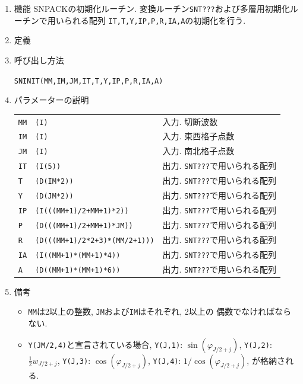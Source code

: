 \documentclass[a4j,fleqn]{jarticle}
\begin{document}
\begin{enumerate}

\item 機能 
SNPACKの初期化ルーチン. 
変換ルーチン{\tt SNT???}および多層用初期化ルーチンで用いられる配列
{\tt IT,T,Y,IP,P,R,IA,A}の初期化を行う.

\item 定義

\item 呼び出し方法 
    
{\tt SNINIT(MM,IM,JM,IT,T,Y,IP,P,R,IA,A)}
  
\item パラメーターの説明 
    
\begin{tabular}{lll}
{\tt MM} & {\tt (I)} & 入力. 切断波数\\
{\tt IM} & {\tt (I)} & 入力. 東西格子点数\\
{\tt JM} & {\tt (I)} & 入力. 南北格子点数\\
{\tt IT}  & {\tt (I(5))}    & 出力. {\tt SNT???}で用いられる配列\\
{\tt T}   & {\tt (D(IM*2))} & 出力. {\tt SNT???}で用いられる配列\\
{\tt Y}  & {\tt (D(JM*2))} & 出力. {\tt SNT???}で用いられる配列\\
{\tt IP}  & {\tt (I(((MM+1)/2+MM+1)*2))} & 出力. {\tt SNT???}で用いられる配列\\
{\tt P}  & {\tt (D(((MM+1)/2+MM+1)*JM))} & 出力. {\tt SNT???}で用いられる配列\\
{\tt R}  & {\tt (D(((MM+1)/2*2+3)*(MM/2+1)))} 
            & 出力. {\tt SNT???}で用いられる配列\\
{\tt IA}  & {\tt (I((MM+1)*(MM+1)*4))} & 出力. {\tt SNT???}で用いられる配列\\
{\tt A}  & {\tt (D((MM+1)*(MM+1)*6))} & 出力. {\tt SNT???}で用いられる配列
\end{tabular}

\item 備考

\begin{itemize}

\item {\tt MM}は2以上の整数, {\tt JM}および{\tt IM}はそれぞれ, 2以上の
偶数でなければならない.

\item {\tt Y(JM/2,4)}と宣言されている場合, 
   {\tt Y(J,1)}:  $\sin(\varphi_{J/2+j})$,
   {\tt Y(J,2)}:  $\frac12 w_{J/2+j}$, 
   {\tt Y(J,3)}:  $\cos(\varphi_{J/2+j})$,
   {\tt Y(J,4)}:  $1/\cos(\varphi_{J/2+j})$,
が格納される.

\end{itemize}

\end{enumerate}
\end{document}
